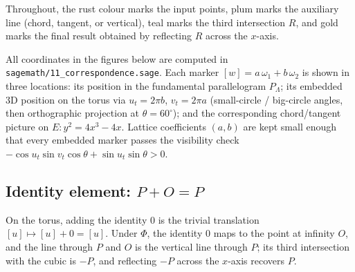 \documentclass[11pt]{article}
\begin{document}
Throughout, the rust colour marks the input points, plum marks the
auxiliary line (chord, tangent, or vertical), teal marks the third
intersection \(R\), and gold marks the final result obtained by reflecting
\(R\) across the \(x\)-axis.

All coordinates in the figures below are computed in
\texttt{sagemath/11\_correspondence.sage}.  Each marker
\([w]=a\,\omega_1+b\,\omega_2\) is shown in three locations:
its position in the fundamental parallelogram \(P_\Lambda\); its embedded
3D position on the torus via \(u_t=2\pi b\), \(v_t=2\pi a\) (small-circle
/ big-circle angles, then orthographic projection at \(\theta=60^\circ\));
and the corresponding chord/tangent picture on \(E:y^2=4x^3-4x\).
Lattice coefficients \((a,b)\) are kept small enough that every embedded
marker passes the visibility check
\(-\cos u_t\sin v_t\cos\theta+\sin u_t\sin\theta>0\).

\subsection{Identity element: \texorpdfstring{$P+O=P$}{P+O=P}}

On the torus, adding the identity \(0\) is the trivial translation
\([u]\mapsto[u]+0=[u]\).  Under \(\Phi\), the identity \(0\) maps to the
point at infinity \(O\), and the line through \(P\) and \(O\) is the
vertical line through \(P\); its third intersection with the cubic is
\(-P\), and reflecting \(-P\) across the \(x\)-axis recovers \(P\).
\end{document}
